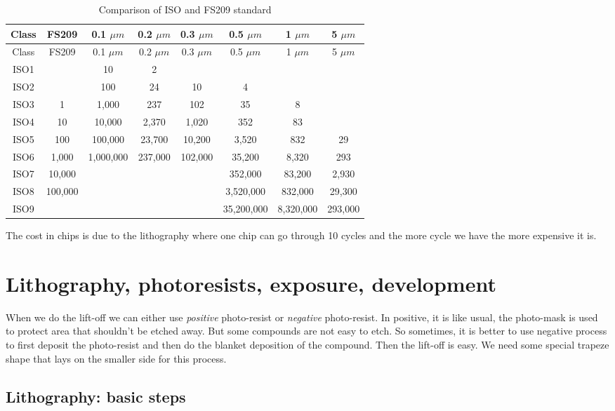 \documentclass[
]{article}
\begin{document}
\hypertarget{tab:my_label}{}
\begin{longtable}[]{@{}cccccccc@{}}
\caption{Comparison of ISO and FS209 standard}\tabularnewline
\toprule\noalign{}
Class & FS209 & 0.1 \(\mu m\) & 0.2 \(\mu m\) & 0.3 \(\mu m\) & 0.5
\(\mu m\) & 1 \(\mu m\) & 5 \(\mu m\) \\
\midrule\noalign{}
\endfirsthead
\toprule\noalign{}
Class & FS209 & 0.1 \(\mu m\) & 0.2 \(\mu m\) & 0.3 \(\mu m\) & 0.5
\(\mu m\) & 1 \(\mu m\) & 5 \(\mu m\) \\
\midrule\noalign{}
\endhead
\bottomrule\noalign{}
\endlastfoot
ISO1 & & 10 & 2 & & & & \\
ISO2 & & 100 & 24 & 10 & 4 & & \\
ISO3 & 1 & 1,000 & 237 & 102 & 35 & 8 & \\
ISO4 & 10 & 10,000 & 2,370 & 1,020 & 352 & 83 & \\
ISO5 & 100 & 100,000 & 23,700 & 10,200 & 3,520 & 832 & 29 \\
ISO6 & 1,000 & 1,000,000 & 237,000 & 102,000 & 35,200 & 8,320 & 293 \\
ISO7 & 10,000 & & & & 352,000 & 83,200 & 2,930 \\
ISO8 & 100,000 & & & & 3,520,000 & 832,000 & 29,300 \\
ISO9 & & & & & 35,200,000 & 8,320,000 & 293,000 \\
\end{longtable}

The cost in chips is due to the lithography where one chip can go
through 10 cycles and the more cycle we have the more expensive it is.

\hypertarget{lithography-photoresists-exposure-development}{%
\section{Lithography, photoresists, exposure,
development}\label{lithography-photoresists-exposure-development}}

When we do the lift-off we can either use \emph{positive} photo-resist
or \emph{negative} photo-resist. In positive, it is like usual, the
photo-mask is used to protect area that shouldn't be etched away. But
some compounds are not easy to etch. So sometimes, it is better to use
negative process to first deposit the photo-resist and then do the
blanket deposition of the compound. Then the lift-off is easy. We need
some special trapeze shape that lays on the smaller side for this
process.

\hypertarget{lithography-basic-steps}{%
\subsection{Lithography: basic steps}\label{lithography-basic-steps}}
\end{document}
